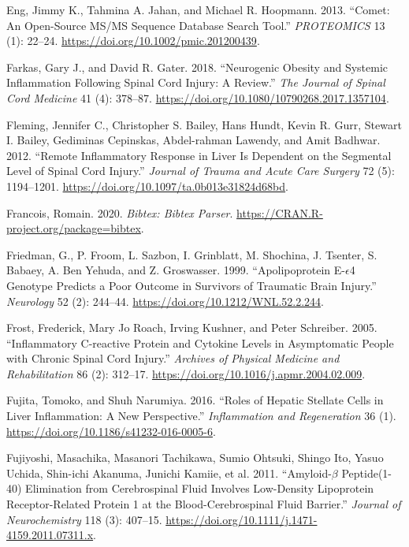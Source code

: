 \documentclass[9pt,lineno]{elife}
\newlength{\cslhangindent}
\newlength{\cslentryspacingunit} %
\newenvironment{CSLReferences}[2] %
 {%
  \setlength{\parindent}{0pt}
  \ifodd #1
  \let\oldpar\par
  \def\par{\hangindent=\cslhangindent\oldpar}
  \fi
  \setlength{\parskip}{#2\cslentryspacingunit}
 }%
 {}
\begin{document}
\begin{CSLReferences}{1}{0}
\leavevmode{}%
Eng, Jimmy K., Tahmina A. Jahan, and Michael R. Hoopmann. 2013. {``Comet: {An} Open-Source {MS}/{MS} Sequence Database Search Tool.''} \emph{PROTEOMICS} 13 (1): 22--24. \url{https://doi.org/10.1002/pmic.201200439}.

\leavevmode{}%
Farkas, Gary J., and David R. Gater. 2018. {``Neurogenic Obesity and Systemic Inflammation Following Spinal Cord Injury: {A} Review.''} \emph{The Journal of Spinal Cord Medicine} 41 (4): 378--87. \url{https://doi.org/10.1080/10790268.2017.1357104}.

\leavevmode{}%
Fleming, Jennifer C., Christopher S. Bailey, Hans Hundt, Kevin R. Gurr, Stewart I. Bailey, Gediminas Cepinskas, Abdel-rahman Lawendy, and Amit Badhwar. 2012. {``Remote Inflammatory Response in Liver Is Dependent on the Segmental Level of Spinal Cord Injury.''} \emph{Journal of Trauma and Acute Care Surgery} 72 (5): 1194--1201. \url{https://doi.org/10.1097/ta.0b013e31824d68bd}.

\leavevmode{}%
Francois, Romain. 2020. \emph{Bibtex: Bibtex Parser}. \url{https://CRAN.R-project.org/package=bibtex}.

\leavevmode{}%
Friedman, G., P. Froom, L. Sazbon, I. Grinblatt, M. Shochina, J. Tsenter, S. Babaey, A. Ben Yehuda, and Z. Groswasser. 1999. {``Apolipoprotein {E-\(\epsilon\)4} Genotype Predicts a Poor Outcome in Survivors of Traumatic Brain Injury.''} \emph{Neurology} 52 (2): 244--44. \url{https://doi.org/10.1212/WNL.52.2.244}.

\leavevmode{}%
Frost, Frederick, Mary Jo Roach, Irving Kushner, and Peter Schreiber. 2005. {``Inflammatory {C-reactive} Protein and Cytokine Levels in Asymptomatic People with Chronic Spinal Cord Injury.''} \emph{Archives of Physical Medicine and Rehabilitation} 86 (2): 312--17. \url{https://doi.org/10.1016/j.apmr.2004.02.009}.

\leavevmode{}%
Fujita, Tomoko, and Shuh Narumiya. 2016. {``Roles of Hepatic Stellate Cells in Liver Inflammation: A New Perspective.''} \emph{Inflammation and Regeneration} 36 (1). \url{https://doi.org/10.1186/s41232-016-0005-6}.

\leavevmode{}%
Fujiyoshi, Masachika, Masanori Tachikawa, Sumio Ohtsuki, Shingo Ito, Yasuo Uchida, Shin-ichi Akanuma, Junichi Kamiie, et al. 2011. {``Amyloid-{\(\beta\)} Peptide(1-40) Elimination from Cerebrospinal Fluid Involves Low-Density Lipoprotein Receptor-Related Protein 1 at the Blood-Cerebrospinal Fluid Barrier.''} \emph{Journal of Neurochemistry} 118 (3): 407--15. \url{https://doi.org/10.1111/j.1471-4159.2011.07311.x}.


\end{CSLReferences}
\end{document}
